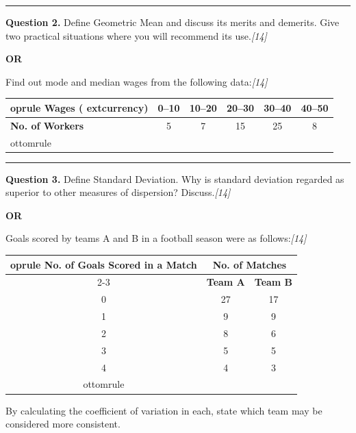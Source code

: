 \documentclass[11pt,a4paper]{article}
\newcommand{\pts}[1]{\hfill   \textit{[#1]}}
\begin{document}
\medskip\rule{\linewidth}{0.2pt}




\noindent   \textbf{Question 2.}
Define Geometric Mean and discuss its merits and demerits. Give two practical situations where you will recommend its use.\pts{14}

\centerline{   \textbf{OR}}

Find out mode and median wages from the following data:\pts{14}

\begin{center}
  \small
  
\begin{tabular}{lccccc}
     oprule
   \textbf{Wages ( extcurrency)} & 0--10 & 10--20 & 20--30 & 30--40 & 40--50 \\
    \midrule
   \textbf{No. of Workers}      & 5     & 7      & 15     & 25     & 8      \\
    ottomrule
  \end{tabular}
\end{center}

\medskip\rule{\linewidth}{0.2pt}




\noindent   \textbf{Question 3.}
Define Standard Deviation. Why is standard deviation regarded as superior to other measures of dispersion? Discuss.\pts{14}

\centerline{   \textbf{OR}}

Goals scored by teams A and B in a football season were as follows:\pts{14}

\begin{center}
  \small
  
\begin{tabular}{ccc}
     oprule
   \textbf{No. of Goals Scored in a Match} & \multicolumn{2}{c}{   \textbf{No. of Matches}} \\
    \cmidrule{2-3}
                                            &   \textbf{Team A} &   \textbf{Team B} \\
    \midrule
    0                                       & 27              & 17              \\
    1                                       & 9               & 9               \\
    2                                       & 8               & 6               \\
    3                                       & 5               & 5               \\
    4                                       & 4               & 3               \\
    ottomrule
  \end{tabular}
\end{center}
By calculating the coefficient of variation in each, state which team may be considered more consistent.
\end{document}
